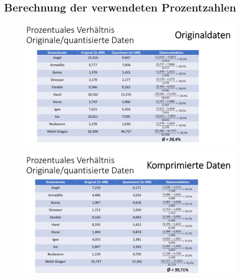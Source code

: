 \subsection{Berechnung der verwendeten Prozentzahlen}
\begin{figure}[h]
  \centering  
  \includegraphics[scale=0.24]{Bilder/ergebnisse_full/orig_proz.png}
\end{figure}
\begin{figure}[h]
  \centering  
  \includegraphics[scale=0.24]{Bilder/ergebnisse_full/komp_proz.png}
\end{figure}
